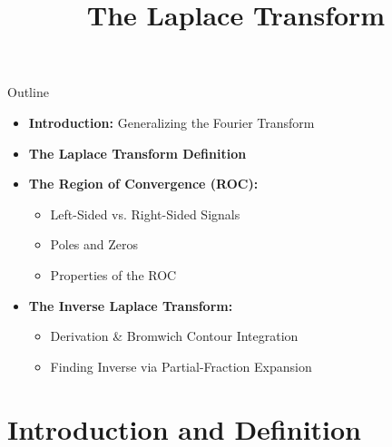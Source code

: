

\title{The Laplace Transform}




\maketitle

\begin{frame}{Outline}
    \begin{itemize}
        \item \textbf{Introduction:} Generalizing the Fourier Transform
        \item \textbf{The Laplace Transform Definition}
        \item \textbf{The Region of Convergence (ROC):}
              \begin{itemize}
                  \item Left-Sided vs. Right-Sided Signals
                  \item Poles and Zeros
                  \item Properties of the ROC
              \end{itemize}
        \item \textbf{The Inverse Laplace Transform:}
              \begin{itemize}
                  \item Derivation \& Bromwich Contour Integration
                  \item Finding Inverse via Partial-Fraction Expansion
              \end{itemize}
    \end{itemize}
\end{frame}

\section{Introduction and Definition}

